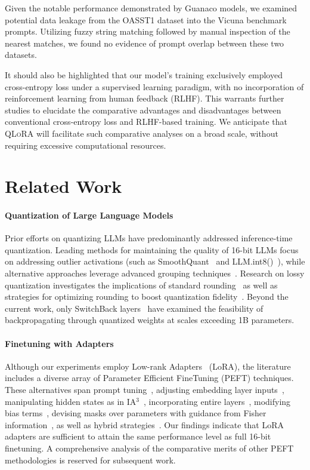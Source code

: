 Given the notable performance demonstrated by {Guanaco} models, we examined potential data leakage from the OASST1 dataset into the Vicuna benchmark prompts. Utilizing fuzzy string matching followed by manual inspection of the nearest matches, we found no evidence of prompt overlap between these two datasets.

It should also be highlighted that our model's training exclusively employed cross-entropy loss under a supervised learning paradigm, with no incorporation of reinforcement learning from human feedback (RLHF). This warrants further studies to elucidate the comparative advantages and disadvantages between conventional cross-entropy loss and RLHF-based training. We anticipate that \textsc{QLoRA} will facilitate such comparative analyses on a broad scale, without requiring excessive computational resources.

\section{Related Work}

\paragraph{Quantization of Large Language Models} Prior efforts on quantizing LLMs have predominantly addressed inference-time quantization. Leading methods for maintaining the quality of 16-bit LLMs focus on addressing outlier activations (such as SmoothQuant~\citep{xiao2022smoothquant} and LLM.int8()~\citep{dettmers2022llm}), while alternative approaches leverage advanced grouping techniques~\citep{park2022nuqmm, yao2022zeroquant}. Research on lossy quantization investigates the implications of standard rounding~\citep{dettmers2022case,zeng2022glm,pope2022efficiently} as well as strategies for optimizing rounding to boost quantization fidelity~\citep{frantar2022gptq}. Beyond the current work, only SwitchBack layers~\citep{wortsman2023stable} have examined the feasibility of backpropagating through quantized weights at scales exceeding 1B parameters.

\paragraph{Finetuning with Adapters} Although our experiments employ Low-rank Adapters~\citep{hu2021lora} (LoRA), the literature includes a diverse array of Parameter Efficient FineTuning (PEFT) techniques. These alternatives span prompt tuning~\citep{qin2021learning,lester2021power,li2021prefix}, adjusting embedding layer inputs~\citep{an2022input}, manipulating hidden states as in IA$^3$~\citep{liu2022few}, incorporating entire layers~\citep{houlsby2019parameter}, modifying bias terms~\citep{zaken2021bitfit}, devising masks over parameters with guidance from Fisher information~\citep{sung2021training}, as well as hybrid strategies~\citep{henderson2021compacter}. Our findings indicate that LoRA adapters are sufficient to attain the same performance level as full 16-bit finetuning. A comprehensive analysis of the comparative merits of other PEFT methodologies is reserved for subsequent work.

